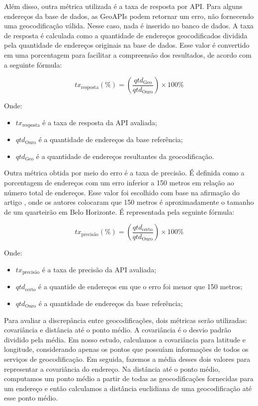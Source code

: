 Além disso, outra métrica utilizada é a taxa de resposta por API. Para alguns endereços da base de dados, as GeoAPIs podem retornar um erro, não fornecendo uma geocodificação válida. Nesse caso, nada é inserido no banco de dados. A taxa de resposta é calculada como a quantidade de endereços geocodificados dividida pela quantidade de endereços originais na base de dados. Esse valor é convertido em uma porcentagem para facilitar a compreensão dos resultados, de acordo com a seguinte fórmula:

\begin{equation}
tx_{\text{resposta}} (\%) = \left(\frac{qtd_{\text{Geo}}}{qtd_{\text{Ouro}}}\right) \times 100\%
\end{equation}

Onde:
\begin{itemize}
    \item $tx_{\text{resposta}}$ é a taxa de resposta da API avaliada;
    \item $qtd_{\text{Ouro}}$ é a quantidade de endereços da base referência;
    \item $qtd_{\text{Geo}}$ é a quantidade de endereços resultantes da geocodificação.
\end{itemize}

Outra métrica obtida por meio do erro é a taxa de precisão. É definida como a porcentagem de endereços com um erro inferior a 150 metros em relação ao número total de endereços. Esse valor foi escolhido com base na afirmação do artigo \cite{Clodoveu2011}, onde os autores colocaram que  150 metros é aproximadamente o tamanho de um quarteirão em Belo Horizonte. É representada pela seguinte fórmula:

\begin{equation}
tx_{\text{precisão}} (\%) = \left(\frac{qtd_{\text{certo}}}{qtd_{\text{Ouro}}}\right) \times 100\%
\end{equation}

Onde:
\begin{itemize}
    \item $tx_{\text{precisão}}$ é a taxa de precisão da API avaliada;
    \item $qtd_{\text{certo}}$ é a quantide de endereços em que o erro foi menor que 150 metros;
    \item $qtd_{\text{Ouro}}$ é a quantidade de endereços da base referência;
\end{itemize}

Para avaliar a discrepância entre geocodificações, dois métricas serão utilizadas: covariância e distância até o ponto médio. A covariância é o desvio padrão dividido pela média. Em nosso estudo, calculamos a covariância para latitude e longitude, considerando apenas os pontos que possuíam informações de todos os serviços de geocodificação. Em seguida, fazemos a média desses dois valores para representar a covariância do endereço. Na distância até o ponto médio, computamos um ponto médio a partir de todas as geocodificações fornecidas para um endereço e então calculamos a distância euclidiana de uma geocodificação até esse ponto médio.

